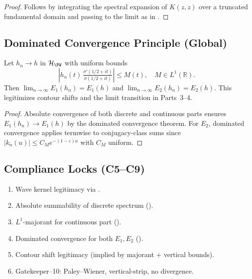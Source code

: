 \begin{proof}\relax
Follows by integrating the spectral expansion of $K(z,z)$ over a truncated fundamental domain and passing to the limit as in . %
\end{proof}

\subsection{Dominated Convergence Principle (Global)}\relax\hspace{0pt}
\label{subsec:dom-conv-global}\relax\hspace{0pt}

\begin{proposition}\label{prop:PW-dominated-convergence}\relax
Let $h_n\to h$ in $\mathcal{H}_{\PW}$ with uniform bounds
\[
|h_n(t)\,\tfrac{\sigma'(1/2+it)}{\sigma(1/2+it)}|\le M(t), \quad M\in L^1(\mathbb{R}).
\]
Then $\lim_{n\to\infty}E_1(h_n)=E_1(h)$ and $\lim_{n\to\infty}E_2(h_n)=E_2(h)$.  
This legitimizes contour shifts and the limit transition in Parts~3–4. %
\end{proposition}

\begin{proof}\relax
Absolute convergence of both discrete and continuous parts ensures $E_1(h_n)\to E_1(h)$ by the dominated convergence theorem.  
For $E_2$, dominated convergence applies termwise to conjugacy-class sums since $|k_n(u)|\le C_M e^{-(1-\varepsilon)u}$ with $C_M$ uniform. %
\end{proof}

\subsection{Compliance Locks (C5–C9)}\relax\hspace{0pt}
\begin{tcolorbox}[colback=gray!3,colframe=gray!50,title={Compliance Check • Part 2/8}] %
\begin{enumerate}[(C5)]
  \item Wave kernel legitimacy via . %
  \item Absolute summability of discrete spectrum (). %
  \item $L^1$-majorant for continuous part (). %
  \item Dominated convergence for both $E_1,E_2$ (). %
  \item Contour shift legitimacy (implied by majorant + vertical bounds). %
  \item Gatekeeper–10: Paley–Wiener, vertical-strip, no divergence. %
\end{enumerate}
\end{tcolorbox}

